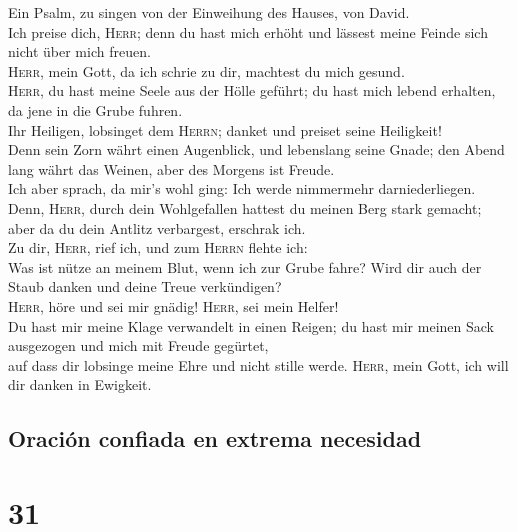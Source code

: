  Ein Psalm, zu singen von der Einweihung des Hauses, von
David.\\
 Ich preise dich, \textsc{Herr}; denn du hast mich erhöht
und lässest meine Feinde sich nicht über mich freuen.\\
 \textsc{Herr}, mein Gott, da ich schrie zu dir, machtest
du mich gesund.\\
 \textsc{Herr}, du hast meine Seele aus der Hölle geführt;
du hast mich lebend erhalten, da jene in die Grube fuhren.\\
 Ihr Heiligen, lobsinget dem \textsc{Herrn}; danket und
preiset seine Heiligkeit!\\
 Denn sein Zorn währt einen Augenblick, und lebenslang
seine Gnade; den Abend lang währt das Weinen, aber des Morgens ist
Freude.\\
 Ich aber sprach, da mir's wohl ging: Ich werde nimmermehr
darniederliegen.\\
 Denn, \textsc{Herr}, durch dein Wohlgefallen hattest du
meinen Berg stark gemacht; aber da du dein Antlitz verbargest, erschrak
ich.\\
 Zu dir, \textsc{Herr}, rief ich, und zum \textsc{Herrn}
flehte ich:\\
 Was ist nütze an meinem Blut, wenn ich zur Grube fahre?
Wird dir auch der Staub danken und deine Treue verkündigen?\\
 \textsc{Herr}, höre und sei mir gnädig! \textsc{Herr},
sei mein Helfer!\\
 Du hast mir meine Klage verwandelt in einen Reigen; du
hast mir meinen Sack ausgezogen und mich mit Freude gegürtet,\\
 auf dass dir lobsinge meine Ehre und nicht stille werde.
\textsc{Herr}, mein Gott, ich will dir danken in Ewigkeit.

\hypertarget{oraciuxf3n-confiada-en-extrema-necesidad}{%
\subsection{Oración confiada en extrema
necesidad}\label{oraciuxf3n-confiada-en-extrema-necesidad}}

\hypertarget{section-30}{%
\section{31}\label{section-30}}


